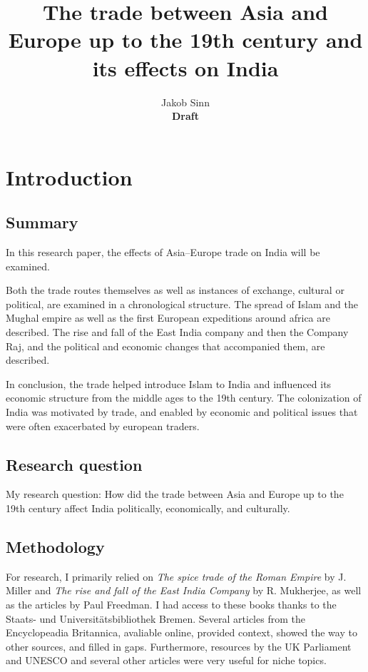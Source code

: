 \documentclass[11pt, a4paper, headings=standardclasses]{scrartcl}
\begin{document}
\renewcommand{\baselinestretch}{1.5}
\subject{Facharbeit}
\author{Jakob Sinn \\ \textbf{Draft}}
\title{The trade between Asia and Europe up to the 19th century and its effects on India}
\maketitle
\thispagestyle{empty}
\clearpage
{}
\tableofcontents
\clearpage
\section{Introduction}
\subsection{Summary}
In this research paper, the effects of Asia--Europe trade on India will be examined.

Both the trade routes themselves as well as instances of exchange, cultural or political, are examined in a chronological structure. The spread of Islam and the Mughal empire as well as the first European expeditions around africa are described. The rise and fall of the East India company and then the Company Raj, and the political and economic changes that accompanied them, are described.

In conclusion, the trade helped introduce Islam to India and influenced its economic structure from the middle ages to the 19th century. The colonization of India was motivated by trade, and enabled by economic and political issues that were often exacerbated by european traders.
\subsection{Research question}
My research question: How did the trade between Asia and Europe up to the 19th century affect India politically, economically, and culturally.
\subsection{Methodology}

For research, I primarily relied on \textit{The spice trade of the Roman Empire} by J. Miller and \textit{The rise and fall of the East India Company} by R. Mukherjee, as well as the articles by Paul Freedman. I had access to these books thanks to the Staats- und Universitätsbibliothek Bremen. Several articles from the Encyclopeadia Britannica, avaliable online, provided context, showed the way to other sources, and filled in gaps. Furthermore, resources by the UK Parliament and UNESCO and several other articles were very useful for niche topics.
\end{document}
